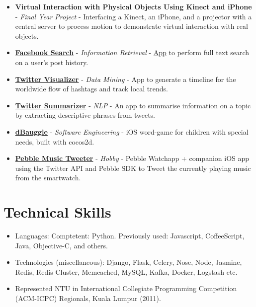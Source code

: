 \begin{itemize}
\item
  \textbf{Virtual Interaction with Physical Objects Using Kinect and
  iPhone} - \emph{Final Year Project} - Interfacing a Kinect, an iPhone,
  and a projector with a central server to process motion to demonstrate
  virtual interaction with real objects.
\item
  \href{https://github.com/arnavk/FacebookSearch}{\textbf{Facebook
  Search}} - \emph{Information Retrieval} -
  \href{http://facebook-search.herokuapp.com/}{App} to perform full text
  search on a user's post history.
\item
  \href{https://github.com/arnavk/Twitter-Visualiser}{\textbf{Twitter
  Visualizer}} - \emph{Data Mining} - App to generate a timeline for the
  worldwide flow of hashtags and track local trends.
\item
  \href{https://github.com/arnavk/NLP}{\textbf{Twitter Summarizer}} -
  \emph{NLP} - An app to summarise information on a topic by extracting
  descriptive phrases from tweets.
\item
  \href{https://itunes.apple.com/us/app/dbauggle!/id625981185?mt=8}{\textbf{dBauggle}}
  - \emph{Software Engineering} - iOS word-game for children with
  special needs, built with cocos2d.
\item
  \href{https://github.com/arnavk/Pebble-MusicTweeter}{\textbf{Pebble
  Music Tweeter}} - \emph{Hobby} - Pebble Watchapp + companion iOS app
  using the Twitter API and Pebble SDK to Tweet the currently playing
  music from the smartwatch.
\end{itemize}

\section{Technical Skills}\label{technical-skills}

\begin{itemize}
\tightlist
\item
  Languages: Comptetent: Python. Previously used: Javascript,
  CoffeeScript, Java, Objective-C, and others.
\item
  Technologies (miscellaneous): Django, Flask, Celery, Nose, Node,
  Jasmine, Redis, Redis Cluster, Memcached, MySQL, Kafka, Docker,
  Logstash etc.
\item
  Represented NTU in International Collegiate Programming Competition
  (ACM-ICPC) Regionals, Kuala Lumpur (2011).
\end{itemize}

